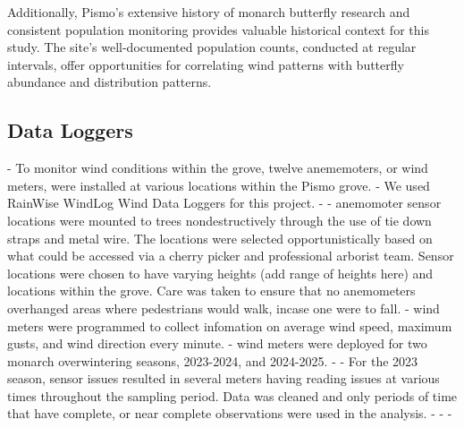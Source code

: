 Additionally, Pismo's extensive history of monarch butterfly research and consistent population monitoring provides valuable historical context for this study. The site's well-documented population counts, conducted at regular intervals, offer opportunities for correlating wind patterns with butterfly abundance and distribution patterns.

\subsection{Data Loggers}

- To monitor wind conditions within the grove, twelve anememoters, or wind meters, were installed at various locations within the Pismo grove.
- We used RainWise WindLog Wind Data Loggers for this project. 
- %
- anemomoter sensor locations were mounted to trees nondestructively through the use of tie down straps and metal wire. The locations were selected opportunistically based on what could be accessed via a cherry picker and professional arborist team. Sensor locations were chosen to have varying heights (add range of heights here) and locations within the grove. Care was taken to ensure that no anemometers overhanged areas where pedestrians would walk, incase one were to fall. 
- wind meters were programmed to collect infomation on average wind speed, maximum gusts, and wind direction every minute. 
- wind meters were deployed for two monarch overwintering seasons, 2023-2024, and 2024-2025. 
- %
- For the 2023 season, sensor issues resulted in several meters having reading issues at various times throughout the sampling period. Data was cleaned and only periods of time that have complete, or near complete observations were used in the analysis. 
- %
- %
- %